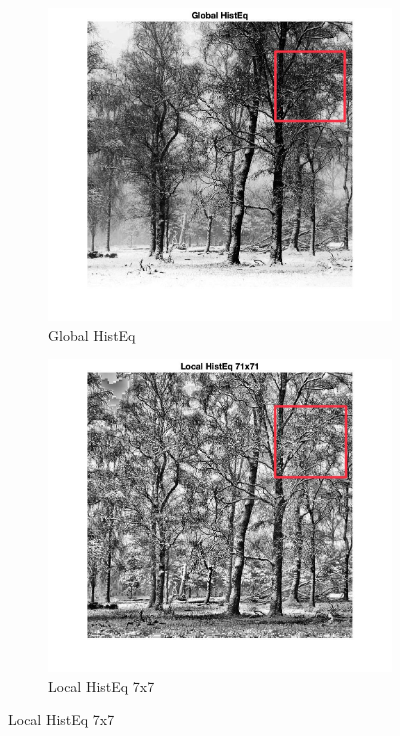 \documentclass[12pt]{article}
\begin{document}
    \begin{figure}[ht]
        \centering
        
        \begin{subfigure}[b]{0.4\textwidth}
            \centering
            \includegraphics[width=\textwidth]{../images/LC2_globalHistEq_1.jpeg}
            \caption{Global HistEq}
        \end{subfigure}
        \hfill
        \begin{subfigure}[b]{0.4\textwidth}
            \centering
            \includegraphics[width=\textwidth]{../images/LC2_localHistEq_1.jpeg}
            \caption{Local HistEq 7x7}
        \end{subfigure}
        

\end{figure}
\end{document}
